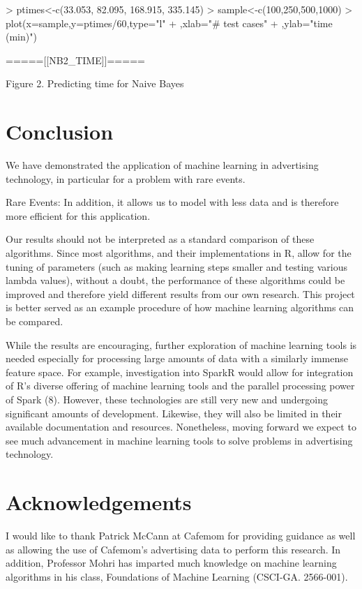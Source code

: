 \documentclass[a4paper]{article}
\begin{document}
\begin{multicols}{2}
\begin{Schunk}
\begin{Sinput}
> ptimes<-c(33.053, 82.095, 168.915, 335.145)
> sample<-c(100,250,500,1000)
> plot(x=sample,y=ptimes/60,type="l"
+      ,xlab="# test cases"
+      ,ylab="time (min)")
\end{Sinput}
\end{Schunk}
\begin{center}
=====[[NB2\_TIME]]=====

Figure 2. Predicting time for Naive Bayes
\end{center}



\section*{Conclusion}
We have demonstrated the application of machine learning in advertising technology, in particular for a problem with rare events. 


Rare Events: In addition, it allows us to model with less data and is therefore more efficient for this application.


Our results should not be interpreted as a standard comparison of these algorithms. Since most algorithms, and their implementations in R, allow for the tuning of parameters (such as making learning steps smaller and testing various lambda values), without a doubt, the performance of these algorithms could be improved and therefore yield different results from our own research. This project is better served as an example procedure of how machine learning algorithms can be compared.

While the results are encouraging, further exploration of machine learning tools is needed especially for processing large amounts of data with a similarly immense feature space. For example, investigation into SparkR would allow for integration of R's diverse offering of machine learning tools and the parallel processing power of Spark (8). However, these technologies are still very new and undergoing significant amounts of development. Likewise, they will also be limited in their available documentation and resources. Nonetheless, moving forward we expect to see much advancement in machine learning tools to solve problems in advertising technology.

\section*{Acknowledgements}
I would like to thank Patrick McCann at Cafemom for providing guidance as well as allowing the use of Cafemom's advertising data to perform this research. In addition, Professor Mohri has imparted much knowledge on machine learning algorithms in his class, Foundations of Machine Learning (CSCI-GA. 2566-001).

\end{multicols}
\end{document}
